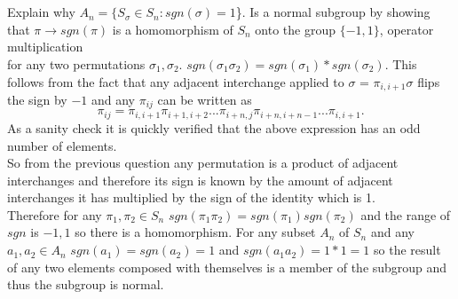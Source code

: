 \documentclass{article}
\begin{document}
    \section{}
    Explain why $A_n = \{S_{ \sigma } \in S_n: sgn(\sigma ) = 1$\}. Is a normal subgroup by showing that $\pi  \rightarrow sgn(\pi )$ is a homomorphism of $S_n$ onto the group $\{-1,1\}$, operator multiplication
    \\
    for any two permutations $\sigma_1, \sigma_2$. $sgn(\sigma_1\sigma_2) = sgn(\sigma_1)*sgn(\sigma_2)$.
    This follows from the fact that any adjacent interchange applied to $\sigma $ =  $\pi_{i,i+1}\sigma $ flips the sign by $-1$ and any $\pi_{ij}$ can be written
    as
    \[    
    \pi_{ij}=\pi_{i,i+1}\pi_{i+1,i+2}...\pi_{i+n,j}\pi_{i+n,i+n-1}...\pi_{i,i+1}
    .\]
    As a sanity check it is quickly verified that the above expression has an odd number of elements.\\
    So from the previous question any permutation is a product of adjacent interchanges and therefore its sign
    is known by the amount of adjacent interchanges it has multiplied by the sign of the identity which is 1.
    \\
    Therefore for any $\pi_1, \pi_2 \in S_n$ $sgn(\pi_1\pi_2) = sgn(\pi_1)sgn(\pi_2)$ and the range of  $sgn$ is $-1,1$ so there is a homomorphism.
    For any subset $A_n$ of $S_n$ and any $a_1,a_2 \in A_n$ $sgn(a_1) = sgn(a_2) = 1$ and $sgn(a_1a_2) = 1*1 = 1$ so the result of any two elements
    composed with themselves is a member of the subgroup and thus the subgroup is normal.
    
\end{document}
